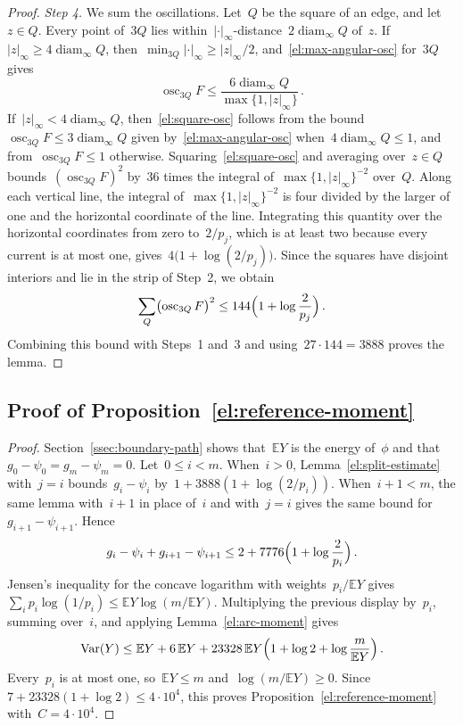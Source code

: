 \documentclass[11pt]{amsart}
\numberwithin{equation}{section}
\newcommand{\EE}{\mathbb E}
\DeclareMathOperator{\diam}{diam}
\begin{document}
\begin{proof}
\emph{Step 4.} We sum the oscillations. Let~$Q$ be the square of an edge, and let~$z\in Q$. Every point of~$3Q$ lies within~$|\cdot|_\infty$-distance~$2\diam_\infty Q$ of~$z$. If~$|z|_\infty\geq4\diam_\infty Q$, then~$\min_{3Q}|\cdot|_\infty\geq|z|_\infty/2$, and~\eqref{el:max-angular-osc} for~$3Q$ gives
\begin{equation}\label{el:square-osc}
 \operatorname{osc}_{3Q}F\leq\frac{6\diam_\infty Q}{\max\{1,|z|_\infty\}}\,.
\end{equation}
If~$|z|_\infty<4\diam_\infty Q$, then~\eqref{el:square-osc} follows from the bound~$\operatorname{osc}_{3Q}F\leq3\diam_\infty Q$ given by~\eqref{el:max-angular-osc} when~$4\diam_\infty Q\leq1$, and from~$\operatorname{osc}_{3Q}F\leq1$ otherwise. Squaring~\eqref{el:square-osc} and averaging over~$z\in Q$ bounds~$(\operatorname{osc}_{3Q}F)^2$ by~$36$ times the integral of~$\max\{1,|z|_\infty\}^{-2}$ over~$Q$. Along each vertical line, the integral of~$\max\{1,|z|_\infty\}^{-2}$ is four divided by the larger of one and the horizontal coordinate of the line. Integrating this quantity over the horizontal coordinates from zero to~$2/p_j$, which is at least two because every current is at most one, gives~$4\bigl(1+\log(2/p_j)\bigr)$. Since the squares have disjoint interiors and lie in the strip of Step~2, we obtain
\begin{equation*}
 \sum_Q\bigl(\operatorname{osc}_{3Q}F\bigr)^2\leq144\Bigl(1+\log\frac2{p_j}\Bigr)\,.
\end{equation*}
Combining this bound with Steps~1 and~3 and using~$27\cdot144=3888$ proves the lemma.
\end{proof}

\subsection{\texorpdfstring{Proof of Proposition~\ref{el:reference-moment}}{Proof of the variance bound}}

\begin{proof}
Section~\ref{ssec:boundary-path} shows that~$\EE Y$ is the energy of~$\phi$ and that~$g_0-\psi_0=g_m-\psi_m=0$. Let~$0\leq i<m$. When~$i>0$, Lemma~\ref{el:split-estimate} with~$j=i$ bounds~$g_i-\psi_i$ by~$1+3888(1+\log(2/p_i))$. When~$i+1<m$, the same lemma with~$i+1$ in place of~$i$ and with~$j=i$ gives the same bound for~$g_{i+1}-\psi_{i+1}$. Hence
\begin{equation*}
 g_i-\psi_i+g_{i+1}-\psi_{i+1}\leq2+7776\Bigl(1+\log\frac2{p_i}\Bigr)\,.
\end{equation*}
Jensen's inequality for the concave logarithm with weights~$p_i/\EE Y$ gives~$\sum_ip_i\log(1/p_i)\leq\EE Y\log(m/\EE Y)$. Multiplying the previous display by~$p_i$, summing over~$i$, and applying Lemma~\ref{el:arc-moment} gives
\begin{equation*}
 \operatorname{Var}(Y)\leq\EE Y+6\,\EE Y+23328\,\EE Y\Bigl(1+\log2+\log\frac m{\EE Y}\Bigr)\,.
\end{equation*}
Every~$p_i$ is at most one, so~$\EE Y\leq m$ and~$\log(m/\EE Y)\geq0$. Since~$7+23328(1+\log2)\leq4\cdot10^4$, this proves Proposition~\ref{el:reference-moment} with~$C=4\cdot10^4$.
\end{proof}



\end{document}
